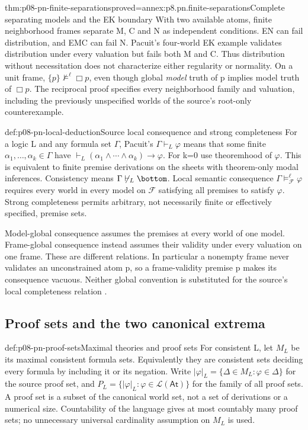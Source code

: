 \begin{hbtheorem}{thm:p08-pn-finite-separations}{proved=annex:p8.pn.finite-separations}{Complete separating models and the EK boundary}
With two available atoms, finite neighborhood frames separate M, C and N as independent
conditions. EN can fail distribution, and EMC can fail N.
Pacuit's four-world EK example validates distribution under every
valuation but fails both M and C. Thus distribution without
necessitation does not characterize either regularity or normality.
On a unit frame, \(\{p\}\not\models^{\ell}\Box p\), even
though global \emph{model} truth of p implies model truth of
\(\Box p\). The reciprocal proof specifies every neighborhood
family and valuation, including the previously unspecified worlds
of the source's root-only counterexample.
\end{hbtheorem}

\begin{hbdefinition}{def:p08-pn-local-deduction}{Source local consequence and strong completeness}
For a logic L and any formula set \(\Gamma\), Pacuit's
\(\Gamma\vdash_L\varphi\) means that some finite
\(\alpha_1,\ldots,\alpha_k\in\Gamma\) have
\(\vdash_L(\alpha_1\land\cdots\land\alpha_k)\to\varphi\).
For k=0 use theoremhood of \(\varphi\). This is equivalent
to finite premise derivations on the sheets with theorem-only modal
inferences. Consistency means \(\Gamma\not\vdash_L\bottom\).
Local semantic consequence \(\Gamma\models^{\ell}_{\mathscr F}\varphi\)
requires every world in every model on \(\mathscr F\) satisfying
all premises to satisfy \(\varphi\). Strong completeness permits
arbitrary, not necessarily finite or effectively specified, premise sets.

Model-global consequence assumes the premises at every world of one
model. Frame-global consequence instead assumes their validity under
every valuation on one frame. These are different relations. In
particular a nonempty frame never validates an unconstrained atom p,
so a frame-validity premise p makes its consequence vacuous. Neither
global convention is substituted for the source's local completeness
relation \cite[defs.~2.30--2.34]{Pacuit2017}.
\end{hbdefinition}

\subsection{Proof sets and the two canonical extrema}

\begin{hbdefinition}{def:p08-pn-proof-sets}{Maximal theories and proof sets}
For consistent L, let \(M_L\) be its maximal consistent formula sets.
Equivalently they are consistent sets deciding every formula by
including it or its negation. Write
\(|\varphi|_L=\{\Delta\in M_L:\varphi\in\Delta\}\)
for the source proof set, and
\(P_L=\{|\varphi|_L:\varphi\in\mathcal L(\mathsf{At})\}\)
for the family of all proof sets. A proof set is a subset of the
canonical world set, not a set of derivations or a numerical size.
Countability of the language gives at most countably many proof sets;
no unnecessary universal cardinality assumption on \(M_L\) is used.
\end{hbdefinition}

